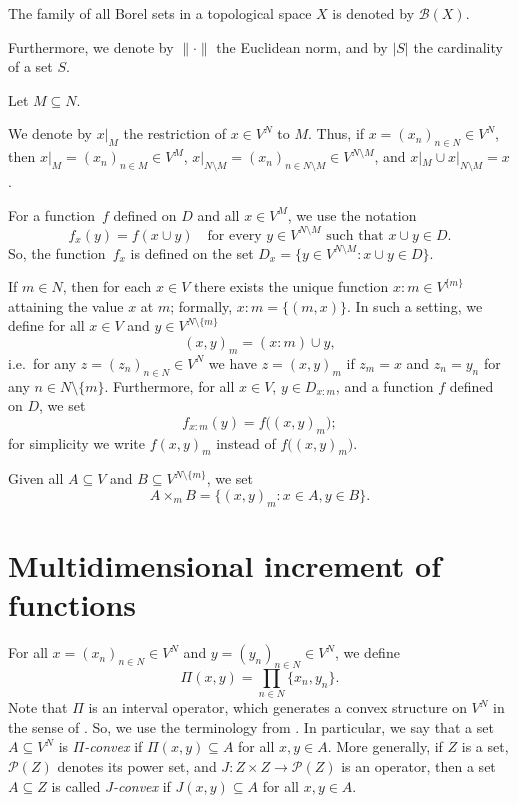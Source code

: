 \documentclass{amsart}
\theoremstyle{plain}%
\theoremstyle{definition}
\theoremstyle{remark}
\begin{document}
The family of all Borel sets in a topological space $X$ is denoted by $\mathcal{B}(X)$. 

Furthermore, we denote by $\|\cdot\|$ the Euclidean norm, and by $|S|$ the cardinality of a set $S$.


Let $M\subseteq N$. 

We denote by $x|_M$ the restriction of $x\in V^N$ to $M$. Thus, if $x=(x_n)_{n\in N}\in V^N$, then $x|_M=(x_n)_{n\in M}\in V^M$, $x|_{N\setminus M}=(x_n)_{n\in N\setminus M}\in V^{N\setminus M}$, and $x|_M\cup x|_{N\setminus M}=x$.

For a function~$f$ defined on $D$ and all $x\in V^M$, we use the notation
\begin{equation*}
f_x(y)=f(x\cup y)\quad \text{for every }y\in V^{N\setminus M}\text{ such that }x\cup y\in D.
\end{equation*}
So, the function~$f_x$ is defined on the set $D_x=\{y\in V^{N\setminus M}: x\cup y\in D\}$.

If $m\in N$, then for each $x\in V$ there exists the unique function $x{:}m\in V^{\{m\}}$ attaining the value $x$ at $m$; formally, $x{:}m=\{(m,x)\}$. In such a setting, we define
for all $x\in V$ and $y\in V^{N\setminus\{m\}}$
\begin{equation*}
(x,y)_m=(x{:}m)\cup y,
\end{equation*}
i.e.\ for any $z=(z_n)_{n\in N}\in V^N$ we have $z=(x,y)_m$ if $z_m=x$ and $z_n=y_n$ for any $n\in N\setminus\{m\}$.
Furthermore, for all $x\in V$, $y\in D_{x{:}m}$, and a function $f$ defined on $D$, we set
\begin{equation*}
f_{x{:}m}(y)=f\big((x,y)_m\big);
\end{equation*}
for simplicity we write $f(x,y)_m$ instead of $f\big((x,y)_m\big)$.

Given all $A\subseteq V$ and $B\subseteq V^{N\setminus\{m\}}$, we set
\begin{equation*}
A\times_mB=\big\{(x,y)_m :x\in A,y\in B\big\}.
\end{equation*}


\section{Multidimensional increment of functions}\label{section3}
For all $x=(x_n)_{n\in N}\in V^N$ and $y=(y_n)_{n\in N}\in V^N$, we define
\begin{equation*}
\Pi(x,y)=\prod_{n\in N}\{x_n,y_n\}.
\end{equation*}
Note that $\Pi$ is an interval operator, which generates a convex structure on $V^N$ in the sense of \cite[Chapter I, \S 4]{V93}.
So, we use the terminology from \cite{V93}. In particular, we say that a set $A\subseteq V^N$ is \emph{$\Pi$\nobreakdash-convex} if $\Pi(x,y)\subseteq A$ for all $x,y\in A$. More generally, if $Z$ is a set, $\mathcal{P}(Z)$ denotes its power set, and $J\colon Z\times Z\to \mathcal P(Z)$ is an operator, then a set $A\subseteq Z$ is called \emph{$J$\nobreakdash-convex} if $J(x,y)\subseteq A$ for all $x,y\in A$. 
\end{document}
